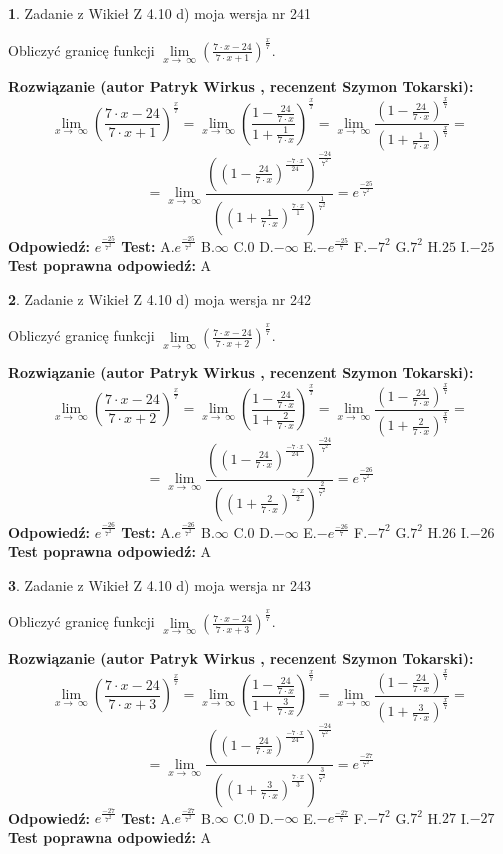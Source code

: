 \documentclass[12pt, a4paper]{article}
\theoremstyle{definition} %
\newtheorem{zad}{}
\newcommand{\zadStart}[1]{\begin{zad}#1\newline}
\newcommand{\zadStop}{\end{zad}}
\newcommand{\rozwStart}[2]{\noindent \textbf{Rozwiązanie (autor #1 , recenzent #2): }\newline}
\newcommand{\rozwStop}{\newline}
\newcommand{\odpStart}{\noindent \textbf{Odpowiedź:}\newline}
\newcommand{\odpStop}{\newline}
\newcommand{\testStart}{\noindent \textbf{Test:}\newline}
\newcommand{\testStop}{\newline}
\newcommand{\kluczStart}{\noindent \textbf{Test poprawna odpowiedź:}\newline}
\newcommand{\kluczStop}{\newline}
\begin{document}
\zadStart{Zadanie z Wikieł Z 4.10 d) moja wersja nr 241}


Obliczyć granicę funkcji  $\lim\limits_{x\to\ \infty}(\frac{7\cdot x-24}{7\cdot x+1})^{\frac{x}{7}}$.
\zadStop
\rozwStart{Patryk Wirkus}{Szymon Tokarski}
$$\lim\limits_{x\to\ \infty}(\frac{7\cdot x-24}{7\cdot x+1})^{\frac{x}{7}} = \lim\limits_{x\to\ \infty}(\frac{1-\frac{24}{7\cdot x}}{1+\frac{1}{7\cdot x}})^{\frac{x}{7}}=\lim\limits_{x\to\ \infty}\frac{(1-\frac{24}{7\cdot x})^{\frac{x}{7}}}{(1+\frac{1}{7\cdot x})^{\frac{x}{7}}}=$$
$$=\lim\limits_{x\to\ \infty}\frac{((1-\frac{24}{7\cdot x})^{\frac{-7\cdot x}{24}})^{\frac{-24}{7^{2}}}}{((1+\frac{1}{7\cdot x})^{\frac{7\cdot x}{1}})^{\frac{1}{7^{2}}}}=e^{\frac{-25}{7^{2}}}$$
\rozwStop
\odpStart
$e^{\frac{-25}{7^{2}}}$
\odpStop
\testStart
A.$e^{\frac{-25}{7^{2}}}$ B.$\infty$ C.$0$ D.$-\infty$ E.$-e^{\frac{-25}{7}}$
F.$-7^{2}$ G.$7^{2}$
H.$25$
I.$-25$
\testStop
\kluczStart
A
\kluczStop



\zadStart{Zadanie z Wikieł Z 4.10 d) moja wersja nr 242}


Obliczyć granicę funkcji  $\lim\limits_{x\to\ \infty}(\frac{7\cdot x-24}{7\cdot x+2})^{\frac{x}{7}}$.
\zadStop
\rozwStart{Patryk Wirkus}{Szymon Tokarski}
$$\lim\limits_{x\to\ \infty}(\frac{7\cdot x-24}{7\cdot x+2})^{\frac{x}{7}} = \lim\limits_{x\to\ \infty}(\frac{1-\frac{24}{7\cdot x}}{1+\frac{2}{7\cdot x}})^{\frac{x}{7}}=\lim\limits_{x\to\ \infty}\frac{(1-\frac{24}{7\cdot x})^{\frac{x}{7}}}{(1+\frac{2}{7\cdot x})^{\frac{x}{7}}}=$$
$$=\lim\limits_{x\to\ \infty}\frac{((1-\frac{24}{7\cdot x})^{\frac{-7\cdot x}{24}})^{\frac{-24}{7^{2}}}}{((1+\frac{2}{7\cdot x})^{\frac{7\cdot x}{2}})^{\frac{2}{7^{2}}}}=e^{\frac{-26}{7^{2}}}$$
\rozwStop
\odpStart
$e^{\frac{-26}{7^{2}}}$
\odpStop
\testStart
A.$e^{\frac{-26}{7^{2}}}$ B.$\infty$ C.$0$ D.$-\infty$ E.$-e^{\frac{-26}{7}}$
F.$-7^{2}$ G.$7^{2}$
H.$26$
I.$-26$
\testStop
\kluczStart
A
\kluczStop



\zadStart{Zadanie z Wikieł Z 4.10 d) moja wersja nr 243}


Obliczyć granicę funkcji  $\lim\limits_{x\to\ \infty}(\frac{7\cdot x-24}{7\cdot x+3})^{\frac{x}{7}}$.
\zadStop
\rozwStart{Patryk Wirkus}{Szymon Tokarski}
$$\lim\limits_{x\to\ \infty}(\frac{7\cdot x-24}{7\cdot x+3})^{\frac{x}{7}} = \lim\limits_{x\to\ \infty}(\frac{1-\frac{24}{7\cdot x}}{1+\frac{3}{7\cdot x}})^{\frac{x}{7}}=\lim\limits_{x\to\ \infty}\frac{(1-\frac{24}{7\cdot x})^{\frac{x}{7}}}{(1+\frac{3}{7\cdot x})^{\frac{x}{7}}}=$$
$$=\lim\limits_{x\to\ \infty}\frac{((1-\frac{24}{7\cdot x})^{\frac{-7\cdot x}{24}})^{\frac{-24}{7^{2}}}}{((1+\frac{3}{7\cdot x})^{\frac{7\cdot x}{3}})^{\frac{3}{7^{2}}}}=e^{\frac{-27}{7^{2}}}$$
\rozwStop
\odpStart
$e^{\frac{-27}{7^{2}}}$
\odpStop
\testStart
A.$e^{\frac{-27}{7^{2}}}$ B.$\infty$ C.$0$ D.$-\infty$ E.$-e^{\frac{-27}{7}}$
F.$-7^{2}$ G.$7^{2}$
H.$27$
I.$-27$
\testStop
\kluczStart
A
\kluczStop
\end{document}
